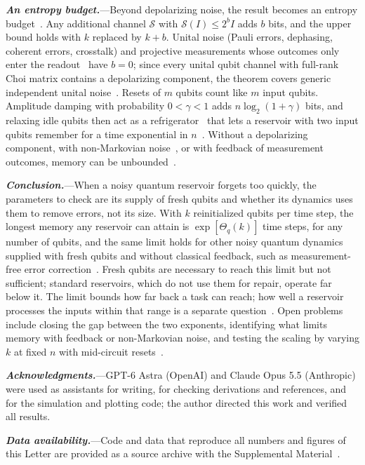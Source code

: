 \documentclass[aps,prl,twocolumn,superscriptaddress,floatfix]{revtex4-2}
\theoremstyle{plain}
\newcommand{\runin}[1]{\textit{\textbf{#1}}---}
\begin{document}
\runin{An entropy budget.}Beyond depolarizing noise, the result becomes an entropy budget~\cite{SM}. Any additional channel $\mathcal S$ with $\mathcal S(I)\le2^bI$ adds $b$ bits, and the upper bound holds with $k$ replaced by $k+b$. Unital noise (Pauli errors, dephasing, coherent errors, crosstalk) and projective measurements whose outcomes only enter the readout~\cite{Mujal2023} have $b=0$; since every unital qubit channel with full-rank Choi matrix contains a depolarizing component, the theorem covers generic independent unital noise~\cite{SM}. Resets of $m$ qubits count like $m$ input qubits. Amplitude damping with probability $0<\gamma<1$ adds $n\log_2(1+\gamma)$ bits, and relaxing idle qubits then act as a refrigerator~\cite{BenOr2013} that lets a reservoir with two input qubits remember for a time exponential in $n$~\cite{SM,Hoeffding1963}. Without a depolarizing component, with non-Markovian noise~\cite{Sannia2026}, or with feedback of measurement outcomes, memory can be unbounded~\cite{SM}.

\runin{Conclusion.}When a noisy quantum reservoir forgets too quickly, the parameters to check are its supply of fresh qubits and whether its dynamics uses them to remove errors, not its size. With $k$ reinitialized qubits per time step, the longest memory any reservoir can attain is $\exp[\Theta_q(k)]$ time steps, for any number of qubits, and the same limit holds for other noisy quantum dynamics supplied with fresh qubits and without classical feedback, such as measurement-free error correction~\cite{Heussen2024}. Fresh qubits are necessary to reach this limit but not sufficient; standard reservoirs, which do not use them for repair, operate far below it. The limit bounds how far back a task can reach; how well a reservoir processes the inputs within that range is a separate question~\cite{Cao2026}. Open problems include closing the gap between the two exponents, identifying what limits memory with feedback or non-Markovian noise, and testing the scaling by varying $k$ at fixed $n$ with mid-circuit resets~\cite{Yasuda2023,Hu2024}.

\begin{acknowledgments}
\runin{Acknowledgments.}GPT-6 Astra (OpenAI) and Claude Opus 5.5 (Anthropic) were used as assistants for writing, for checking derivations and references, and for the simulation and plotting code; the author directed this work and verified all results.
\end{acknowledgments}

\runin{Data availability.}Code and data that reproduce all numbers and figures of this Letter are provided as a source archive with the Supplemental Material~\cite{SM}.
\end{document}
